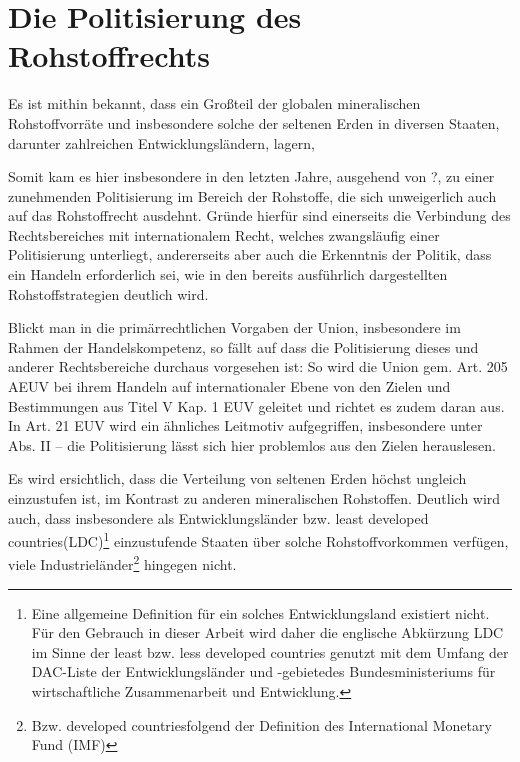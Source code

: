 \documentclass[12pt,a4paper,oneside]{book} %
\begin{document}
{	\section{Die Politisierung des Rohstoffrechts}
	
	Es ist mithin bekannt, dass ein Großteil der globalen mineralischen Rohstoffvorräte und insbesondere solche der seltenen Erden in diversen Staaten, darunter zahlreichen Entwicklungsländern, lagern, 
	
	Somit kam es hier insbesondere in den letzten Jahre, ausgehend von ?, zu einer zunehmenden Politisierung im Bereich der Rohstoffe, die sich unweigerlich auch auf das Rohstoffrecht ausdehnt. Gründe hierfür sind einerseits die Verbindung des Rechtsbereiches mit internationalem Recht, welches zwangsläufig einer Politisierung unterliegt, andererseits aber auch die Erkenntnis der Politik, dass ein Handeln erforderlich sei, wie in den bereits ausführlich dargestellten Rohstoffstrategien deutlich wird.
	
	Blickt man in die primärrechtlichen Vorgaben der Union, insbesondere im Rahmen der Handelskompetenz, so fällt auf dass die Politisierung dieses und anderer Rechtsbereiche durchaus vorgesehen ist: So wird die Union gem. Art. 205 AEUV bei ihrem Handeln auf internationaler Ebene von den Zielen und Bestimmungen aus Titel V Kap. 1 EUV geleitet und richtet es zudem daran aus. In Art. 21 EUV wird ein ähnliches Leitmotiv aufgegriffen, insbesondere unter Abs. II -- die Politisierung lässt sich hier problemlos aus den Zielen herauslesen.
	
	
	
	Es wird ersichtlich, dass die Verteilung von seltenen Erden höchst ungleich einzustufen ist, im Kontrast zu anderen mineralischen Rohstoffen. Deutlich wird auch, dass insbesondere als Entwicklungsländer bzw. \glqq least developed countries\grqq (LDC)\footnote{Eine allgemeine Definition für ein solches Entwicklungsland existiert nicht. Für den Gebrauch in dieser Arbeit wird daher die englische Abkürzung LDC im Sinne der least bzw. less developed countries genutzt mit dem Umfang der \glqq DAC-Liste der Entwicklungsländer und -gebiete\grqq des Bundesministeriums für wirtschaftliche Zusammenarbeit und Entwicklung.} einzustufende Staaten über solche Rohstoffvorkommen verfügen, viele Industrieländer\footnote{Bzw. \glqq developed countries\grqq folgend der Definition des International Monetary Fund (IMF)} hingegen nicht. 
	
}
\end{document}
